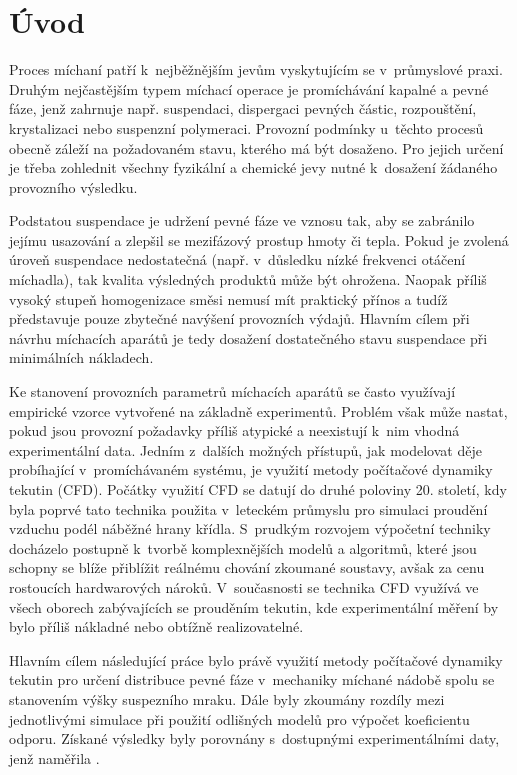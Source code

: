 \chapter{Úvod}
Proces míchaní patří k~nejběžnějším jevům vyskytujícím se v~průmyslové praxi. Druhým nejčastějším typem míchací operace je promíchávání kapalné a pevné fáze, jenž zahrnuje např. suspendaci, dispergaci pevných částic, rozpouštění, krystalizaci nebo suspenzní polymeraci. Provozní podmínky u~těchto procesů obecně záleží na požadovaném stavu, kterého má být dosaženo. Pro jejich určení je třeba zohlednit všechny fyzikální a chemické jevy nutné k~dosažení žádaného provozního výsledku. 


Podstatou suspendace je udržení pevné fáze ve vznosu tak, aby se zabránilo jejímu usazování a zlepšil se mezifázový prostup hmoty či tepla. Pokud je zvolená úroveň suspendace nedostatečná (např. v~důsledku nízké frekvenci otáčení míchadla), tak kvalita výsledných produktů může být ohrožena. Naopak příliš vysoký stupeň homogenizace směsi nemusí mít praktický přínos a tudíž představuje pouze zbytečné navýšení provozních výdajů. Hlavním cílem  při návrhu míchacích aparátů je tedy dosažení dostatečného stavu suspendace při minimálních nákladech. 

Ke stanovení provozních parametrů míchacích aparátů se často využívají empirické vzorce vytvořené na základně experimentů. Problém však může nastat, pokud jsou provozní po\-ža\-dav\-ky příliš atypické a neexistují k~nim vhodná experimentální data. Jedním z~dalších možných přístupů, jak modelovat děje pro\-bí\-ha\-jí\-cí v~promíchávaném systému, je využití metody po\-čí\-ta\-čo\-vé dynamiky tekutin (CFD). Počátky využití CFD se datují do druhé poloviny 20. století, kdy byla poprvé tato technika použita v~leteckém průmyslu pro simulaci proudění vzduchu podél náběžné hrany křídla. S~prudkým rozvojem výpočetní techniky docházelo postupně k~tvorbě komplexnějších modelů a algoritmů, které jsou schopny se blíže přiblížit reálnému chování zkoumané soustavy, avšak za cenu rostoucích hardwarových nároků. V~současnosti se technika CFD využívá ve všech oborech zabývajících se prouděním tekutin, kde experimentální měření by bylo příliš nákladné nebo obtížně realizovatelné.   

Hlavním cílem následující práce bylo právě využití metody počítačové dynamiky tekutin pro určení distribuce pevné fáze v~mechaniky míchané nádobě spolu se stanovením výšky suspezního mraku. Dále byly zkoumány rozdíly mezi jednotlivými simulace při použití odlišných modelů pro výpočet koeficientu odporu.  Získané výsledky byly porovnány s~dostupnými experimentálními daty, jenž naměřila \citet{pav11}.
